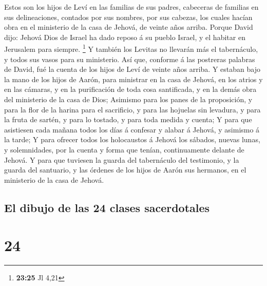  Estos son los hijos de Leví en las familias de sus
padres, cabeceras de familias en sus delineaciones, contados por sus
nombres, por sus cabezas, los cuales hacían obra en el ministerio de la
casa de Jehová, de veinte años arriba.  Porque David
dijo: Jehová Dios de Israel ha dado reposo á su pueblo Israel, y el
habitar en Jerusalem para siempre. \footnote{\textbf{23:25} Jl 4,21}
 Y también los Levitas no llevarán más el tabernáculo, y
todos sus vasos para su ministerio.  Así que, conforme á
las postreras palabras de David, fué la cuenta de los hijos de Leví de
veinte años arriba.  Y estaban bajo la mano de los hijos
de Aarón, para ministrar en la casa de Jehová, en los atrios y en las
cámaras, y en la purificación de toda cosa santificada, y en la demás
obra del ministerio de la casa de Dios;  Asimismo para
los panes de la proposición, y para la flor de la harina para el
sacrificio, y para las hojuelas sin levadura, y para la fruta de sartén,
y para lo tostado, y para toda medida y cuenta;  Y para
que asistiesen cada mañana todos los días á confesar y alabar á Jehová,
y asimismo á la tarde;  Y para ofrecer todos los
holocaustos á Jehová los sábados, nuevas lunas, y solemnidades, por la
cuenta y forma que tenían, continuamente delante de Jehová.
 Y para que tuviesen la guarda del tabernáculo del
testimonio, y la guarda del santuario, y las órdenes de los hijos de
Aarón sus hermanos, en el ministerio de la casa de Jehová.

\hypertarget{el-dibujo-de-las-24-clases-sacerdotales}{%
\subsection{El dibujo de las 24 clases
sacerdotales}\label{el-dibujo-de-las-24-clases-sacerdotales}}

\hypertarget{section-23}{%
\section{24}\label{section-23}}

